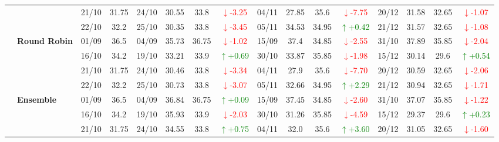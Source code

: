 \documentclass{ieeeaccess}
\begin{document}
{\begin{longtable}{llcc|cccc|cccc|cccc}
&
& 21/10 & 31.75 & 24/10 & 30.55 & 33.8 & \textcolor{red}{\(\downarrow\)-3.25} & 04/11 & 27.85 & 35.6 & \textcolor{red}{\(\downarrow\)-7.75} & 20/12 & 31.58 & 32.65 & \textcolor{red}{\(\downarrow\)-1.07} \\

&
& 22/10 & 32.2 & 25/10 & 30.35 & 33.8 & \textcolor{red}{\(\downarrow\)-3.45} & 05/11 & 34.53 & 34.95 & \textcolor{green}{\(\uparrow\)+0.42} & 21/12 & 31.57 & 32.65 & \textcolor{red}{\(\downarrow\)-1.08} \\
\cmidrule(lr){2-16}


& \textbf{Round Robin}
& 01/09 & 36.5 & 04/09 & 35.73 & 36.75 & \textcolor{red}{\(\downarrow\)-1.02} & 15/09 & 37.4 & 34.85 & \textcolor{red}{\(\downarrow\)-2.55} & 31/10 & 37.89 & 35.85 & \textcolor{red}{\(\downarrow\)-2.04} \\

&
& 16/10 & 34.2 & 19/10 & 33.21 & 33.9 & \textcolor{green}{\(\uparrow\)+0.69} & 30/10 & 33.87 & 35.85 & \textcolor{red}{\(\downarrow\)-1.98} & 15/12 & 30.14 & 29.6 & \textcolor{green}{\(\uparrow\)+0.54} \\

&
& 21/10 & 31.75 & 24/10 & 30.46 & 33.8 & \textcolor{red}{\(\downarrow\)-3.34} & 04/11 & 27.9 & 35.6 & \textcolor{red}{\(\downarrow\)-7.70} & 20/12 & 30.59 & 32.65 & \textcolor{red}{\(\downarrow\)-2.06} \\

&
& 22/10 & 32.2 & 25/10 & 30.73 & 33.8 & \textcolor{red}{\(\downarrow\)-3.07} & 05/11 & 32.66 & 34.95 & \textcolor{green}{\(\uparrow\)+2.29} & 21/12 & 30.94 & 32.65 & \textcolor{red}{\(\downarrow\)-1.71} \\
\cmidrule(lr){2-16}



& \textbf{Ensemble}
& 01/09 & 36.5 & 04/09 & 36.84 & 36.75 & \textcolor{green}{\(\uparrow\)+0.09} & 15/09 & 37.45 & 34.85 & \textcolor{red}{\(\downarrow\)-2.60} & 31/10 & 37.07 & 35.85 & \textcolor{red}{\(\downarrow\)-1.22} \\

&
& 16/10 & 34.2 & 19/10 & 35.93 & 33.9 & \textcolor{red}{\(\downarrow\)-2.03} & 30/10 & 31.26 & 35.85 & \textcolor{red}{\(\downarrow\)-4.59} & 15/12 & 29.37 & 29.6 & \textcolor{green}{\(\uparrow\)+0.23} \\

&
& 21/10 & 31.75 & 24/10 & 34.55 & 33.8 & \textcolor{green}{\(\uparrow\)+0.75} & 04/11 & 32.0 & 35.6 & \textcolor{green}{\(\uparrow\)+3.60} & 20/12 & 31.05 & 32.65 & \textcolor{red}{\(\downarrow\)-1.60} \\


\end{longtable}}
\end{document}
